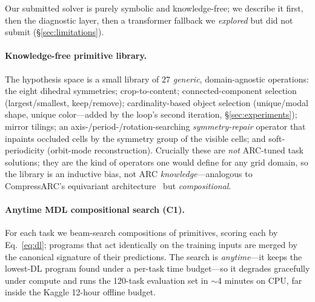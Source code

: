 Our submitted solver is purely symbolic and knowledge-free; we describe it first, then the diagnostic layer,
then a transformer fallback we \emph{explored} but did not submit (\S\ref{sec:limitations}).

\paragraph{Knowledge-free primitive library.} The hypothesis space is a small library of $27$
\emph{generic}, domain-agnostic operations: the eight dihedral symmetries; crop-to-content; connected-component
selection (largest/smallest, keep/remove); cardinality-based object selection (unique/modal shape, unique
color---added by the loop's second iteration, \S\ref{sec:experiments}); mirror tilings; an
axis-/period-/rotation-searching \emph{symmetry-repair} operator that inpaints occluded cells by the symmetry
group of the visible cells; and soft-periodicity (orbit-mode reconstruction). Crucially these are \emph{not} ARC-tuned task solutions; they
are the kind of operators one would define for any grid domain, so the library is an inductive bias, not ARC
\emph{knowledge}---analogous to CompressARC's equivariant architecture~\cite{liao2025compressarc} but
\emph{compositional}.

\paragraph{Anytime MDL compositional search (C1).} For each task we beam-search compositions of primitives,
scoring each by Eq.~\eqref{eq:dl}; programs that act identically on the training inputs are merged by the
canonical signature of their predictions. The search is \emph{anytime}---it keeps the lowest-DL program found
under a per-task time budget---so it degrades gracefully under compute and runs the 120-task evaluation set in
$\sim$4 minutes on CPU, far inside the Kaggle 12-hour offline budget.

